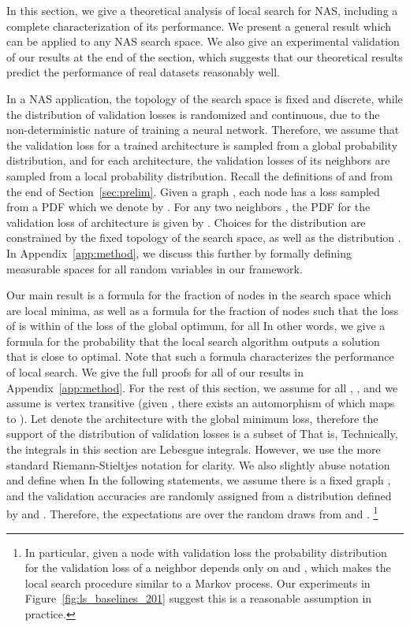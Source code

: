 

In this section, we give a theoretical analysis of local search for NAS,
including a complete characterization of its performance.
We present a general result which can be applied to any NAS search space.
We also give an experimental validation of our results at the end of the
section, which suggests that our theoretical results predict the performance
of real datasets reasonably well.

In a NAS application,
the topology of the search space is fixed and discrete, 
while the distribution of validation losses
is randomized and continuous,
due to the non-deterministic nature of training a neural network.
Therefore, we assume that the validation loss for a trained architecture 
is sampled from
a global probability distribution, and for each architecture, 
the validation losses of its neighbors are sampled from a local probability distribution.
Recall the definitions of  and  from the end of
Section~\ref{sec:prelim}.
Given a graph , each node  has a loss 
 sampled from a PDF which we denote by . 
For any two neighbors , the PDF for the validation loss  
of architecture  is given by .
Choices for the distribution  are constrained by the 
fixed topology of the search space, as well as the distribution .
In Appendix~\ref{app:method}, 
we discuss this further by formally defining
measurable spaces for all random variables in our framework.

Our main result is a formula for the fraction of nodes in the search space which 
are local minima, as well as a formula for the fraction of nodes  
such that the loss of  
is within  of the loss of the global optimum, for all 
In other words, we give a formula for the probability that the local search algorithm 
outputs a solution that is close to optimal.
Note that such a formula characterizes the performance of local search.
We give the full proofs for all of our results 
in Appendix~\ref{app:method}.
For the rest of this section, 
we assume for all , , and
we assume  is vertex transitive
(given , there exists an automorphism of  which maps  to ).
Let  denote the architecture with the global minimum loss, therefore
the support of the distribution of validation losses is a subset of  
That is,  
Technically, the integrals in this section are Lebesgue integrals. However, we use the more standard Riemann-Stieltjes notation for clarity. We also slightly abuse notation and
define  when 
In the following statements, we assume there is a fixed graph , and the 
validation accuracies are randomly assigned from a distribution defined by  
and . Therefore, the expectations are over the random draws from  and .
\footnote{
In particular, given a node  with validation loss 
the probability distribution for the validation loss of a neighbor depends only 
on  and , which makes the local search procedure similar to a 
Markov process.  Our experiments in Figure~\ref{fig:ls_baselines_201}
suggest this is a reasonable assumption in practice.
}


